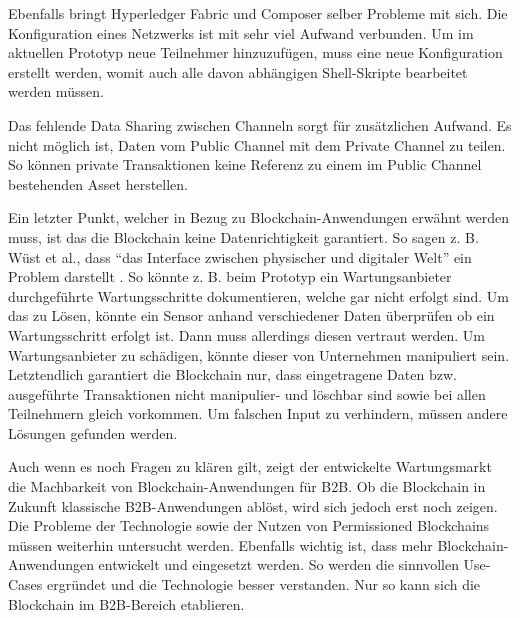 Ebenfalls bringt Hyperledger Fabric und Composer selber Probleme mit sich. Die Konfiguration eines Netzwerks ist mit sehr viel Aufwand verbunden. Um im aktuellen Prototyp neue Teilnehmer hinzuzufügen, muss eine neue Konfiguration erstellt werden, womit auch alle davon abhängigen Shell-Skripte bearbeitet werden müssen. 

Das fehlende Data Sharing zwischen Channeln sorgt für zusätzlichen Aufwand. Es nicht möglich ist, Daten vom Public Channel mit dem Private Channel zu teilen. So können private Transaktionen keine Referenz zu einem im Public Channel bestehenden Asset herstellen.

Ein letzter Punkt, welcher in Bezug zu Blockchain-Anwendungen erwähnt werden muss, ist das die Blockchain keine Datenrichtigkeit garantiert. So sagen z. B. Wüst et al., dass ``das Interface zwischen physischer und digitaler Welt'' ein Problem darstellt \cite{WustyouneedBlockchain2017}. So könnte z. B. beim Prototyp ein Wartungsanbieter durchgeführte Wartungsschritte dokumentieren, welche gar nicht erfolgt sind. Um das zu Lösen, könnte ein Sensor anhand verschiedener Daten überprüfen ob ein Wartungsschritt erfolgt ist. Dann muss allerdings diesen vertraut werden. Um Wartungsanbieter zu schädigen, könnte dieser von Unternehmen manipuliert sein. Letztendlich garantiert die Blockchain nur, dass eingetragene Daten bzw. ausgeführte Transaktionen nicht manipulier- und löschbar sind sowie bei allen Teilnehmern gleich vorkommen. Um falschen Input zu verhindern, müssen andere Lösungen gefunden werden.

Auch wenn es noch Fragen zu klären gilt, zeigt der entwickelte Wartungsmarkt die Machbarkeit von Blockchain-Anwendungen für B2B. Ob die Blockchain in Zukunft klassische B2B-Anwendungen ablöst, wird sich jedoch erst noch zeigen. Die Probleme der Technologie sowie der Nutzen von Permissioned Blockchains müssen weiterhin untersucht werden. Ebenfalls wichtig ist, dass mehr Blockchain-Anwendungen entwickelt und eingesetzt werden. So werden die sinnvollen Use-Cases ergründet und die Technologie besser verstanden. Nur so kann sich die Blockchain im B2B-Bereich etablieren.




